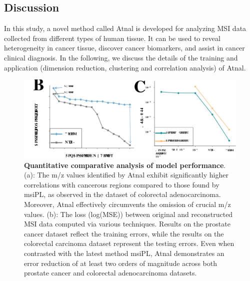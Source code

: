 \documentclass{WileyMSP-template}
\begin{document}
\subsection{Discussion}
In this study, a novel method called Atnal is developed 
for analyzing MSI data collected from different types of 
human tissue. It can be used to reveal heterogeneity in cancer 
tissue, discover  
cancer biomarkers, and assist in cancer clinical diagnosis.
In the following, we discuss the details of the training and application 
(dimension reduction, clustering and correlation analysis) of Atnal. 
\begin{figure}[htbp]
  \centering
  \includegraphics[width=0.8\linewidth]{pic/result.pdf}
\captionsetup{justification=raggedright,singlelinecheck=false}
\caption
  { 
    \textbf{Quantitative comparative analysis of model performance}. 
  (a): The m/z values identified by Atnal exhibit significantly higher 
  correlations with cancerous regions compared to those found by msiPL, 
  as observed in the dataset of colorectal adenocarcinoma. Moreover, 
  Atnal effectively circumvents the omission of crucial m/z values. 
  (b): The loss (log(MSE)) between original and reconstructed 
  MSI data computed via  
  various techniques. 
  Results on the prostate cancer dataset reflect the training errors, while the 
  results on the colorectal carcinoma dataset represent the testing errors.  
  Even when contrasted with the latest method 
  msiPL, Atnal demonstrates an error 
  reduction of at least two orders of magnitude 
  across both prostate cancer and colorectal adenocarcinoma datasets. 
  }
\label{fig:model performance}
\end{figure}
\end{document}
